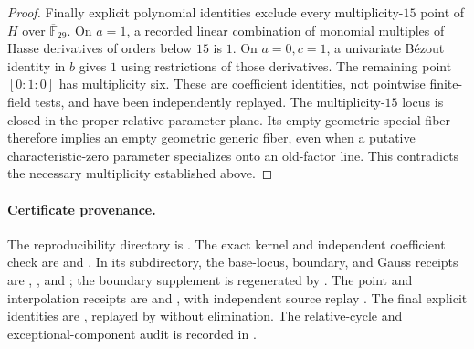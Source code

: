 \begin{proof}
Finally explicit polynomial identities exclude every multiplicity-$15$
point of $H$ over $\overline{\mathbb F}_{29}$. On $a=1$, a recorded linear
combination of monomial multiples of Hasse derivatives of orders below
$15$ is $1$. On $a=0,c=1$, a univariate B\'ezout identity in $b$ gives
$1$ using restrictions of those derivatives. The remaining point
$[0:1:0]$ has multiplicity six. These are coefficient identities, not
pointwise finite-field tests, and have been independently replayed.
The multiplicity-$15$ locus is closed in the proper relative parameter
plane. Its empty geometric special fiber therefore implies an empty
geometric generic fiber, even when a putative characteristic-zero
parameter specializes onto an old-factor line. This contradicts the
necessary multiplicity established above.
\end{proof}

\paragraph{Certificate provenance.}
The reproducibility directory is
.
The exact kernel and independent coefficient check are
 and .
In its  subdirectory, the base-locus, boundary, and Gauss
receipts are ,
, and
; the boundary supplement is regenerated
by .
The point and interpolation receipts are
 and
, with independent source replay
.
The final explicit identities are
, replayed by
 without elimination.
The relative-cycle and exceptional-component audit is recorded in
.

